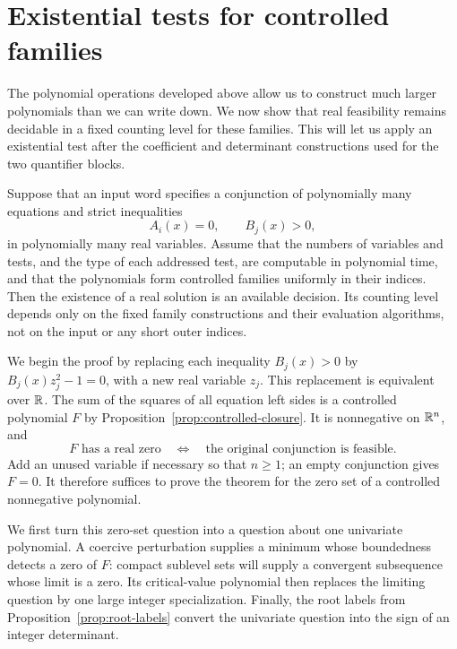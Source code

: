 \section{Existential tests for controlled families}
\label{sec:existential}

The polynomial operations developed above allow us to construct much
larger polynomials than we can write down.  We now show that real
feasibility remains decidable in a fixed counting level for these
families.  This will let us apply an existential test after the
coefficient and determinant constructions used for the two quantifier
blocks.

\begin{theorem}\label{thm:controlled-existential}
Suppose that an input word specifies a conjunction of polynomially many
equations and strict inequalities
\[
 A_i(x)=0,\qquad B_j(x)>0,
\]
in polynomially many real variables.  Assume that the numbers of
variables and tests, and the type of each addressed test, are computable
in polynomial time, and that the polynomials form controlled families
uniformly in their indices.  Then the existence of a real solution is
an available decision.  Its counting level depends only on the fixed
family constructions and their evaluation algorithms, not on the input
or any short outer indices.
\end{theorem}

We begin the proof by replacing each inequality $B_j(x)>0$ by
$B_j(x)z_j^2-1=0$, with a new real variable $z_j$.  This replacement is
equivalent over $\mathbb R$.  The sum of the squares of all equation left sides
is a controlled polynomial $F$ by
Proposition~\ref{prop:controlled-closure}.  It is nonnegative on
$\mathbb R^n$, and
\[
 F\text{ has a real zero}
 \quad\Longleftrightarrow\quad
 \text{the original conjunction is feasible}.
\]
Add an unused variable if necessary so that $n\ge1$; an empty conjunction
gives $F=0$.  It therefore suffices to prove the theorem for the zero set
of a controlled nonnegative polynomial.

We first turn this zero-set question into a question about one
univariate polynomial.  A coercive perturbation supplies a minimum
whose boundedness detects a zero of $F$: compact sublevel sets will
supply a convergent subsequence whose limit is a zero.  Its critical-value
polynomial then replaces the limiting question by one large integer
specialization.  Finally, the root labels from
Proposition~\ref{prop:root-labels} convert the univariate question into
the sign of an integer determinant.


